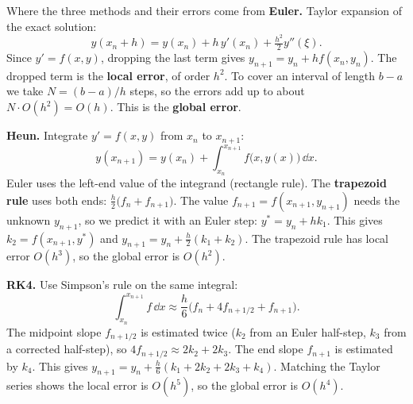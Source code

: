 \begin{derivbox}{Where the three methods and their errors come from}
\textbf{Euler.} Taylor expansion of the exact solution:
\[ y(x_n + h) = y(x_n) + h\,y'(x_n) + \tfrac{h^2}{2}y''(\xi). \]
Since $y' = f(x,y)$, dropping the last term gives $y_{n+1} = y_n + hf(x_n,y_n)$. The dropped term is the \textbf{local error}, of order $h^2$. To cover an interval of length $b-a$ we take $N = (b-a)/h$ steps, so the errors add up to about $N\cdot O(h^2) = O(h)$. This is the \textbf{global error}.

\textbf{Heun.} Integrate $y' = f(x,y)$ from $x_n$ to $x_{n+1}$:
\[ y(x_{n+1}) = y(x_n) + \int_{x_n}^{x_{n+1}}f\big(x,y(x)\big)\,\dd x . \]
Euler uses the left-end value of the integrand (rectangle rule). The \textbf{trapezoid rule} uses both ends: $\frac h2\big(f_n + f_{n+1}\big)$. The value $f_{n+1} = f(x_{n+1}, y_{n+1})$ needs the unknown $y_{n+1}$, so we predict it with an Euler step: $y^* = y_n + hk_1$. This gives $k_2 = f(x_{n+1}, y^*)$ and $y_{n+1} = y_n + \frac h2(k_1+k_2)$. The trapezoid rule has local error $O(h^3)$, so the global error is $O(h^2)$.

\textbf{RK4.} Use Simpson's rule on the same integral:
\[ \int_{x_n}^{x_{n+1}}f\,\dd x \approx \frac h6\big(f_n + 4f_{n+1/2} + f_{n+1}\big). \]
The midpoint slope $f_{n+1/2}$ is estimated twice ($k_2$ from an Euler half-step, $k_3$ from a corrected half-step), so $4f_{n+1/2}\approx 2k_2 + 2k_3$. The end slope $f_{n+1}$ is estimated by $k_4$. This gives $y_{n+1} = y_n + \frac h6(k_1 + 2k_2 + 2k_3 + k_4)$. Matching the Taylor series shows the local error is $O(h^5)$, so the global error is $O(h^4)$.
\end{derivbox}

